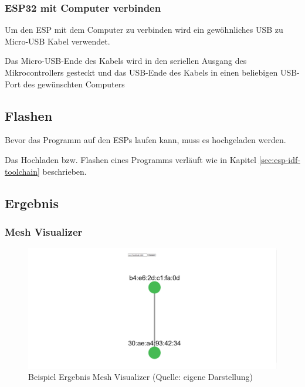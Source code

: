 \subsubsection{ESP32 mit Computer verbinden}
Um den ESP mit dem Computer zu verbinden wird ein gewöhnliches USB zu Micro-USB Kabel verwendet.

Das Micro-USB-Ende des Kabels wird in den seriellen Ausgang des Mikrocontrollers gesteckt und das USB-Ende des Kabels in einen beliebigen USB-Port des gewünschten Computers

\subsection{Flashen}

Bevor das Programm auf den ESPs laufen kann, muss es hochgeladen werden.

Das Hochladen bzw. Flashen eines Programms verläuft wie in Kapitel \ref{sec:esp-idf-toolchain} beschrieben.

\subsection{Ergebnis}\label{sec:example-result}

\subsubsection{Mesh Visualizer}

\begin{figure}[H]
    \begin{center}
        \includegraphics[scale=0.3]{images/example_result_mesh_visualizer.png}
        \caption{Beispiel Ergebnis Mesh Visualizer (Quelle: eigene Darstellung)}
        \label{abb:example_result_mesh_visualizer}
    \end{center}
\end{figure}

